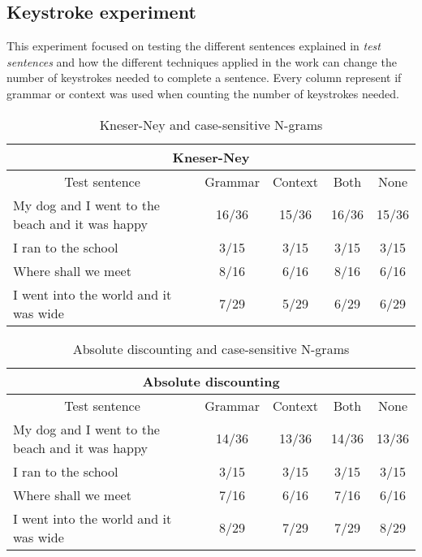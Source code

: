 \subsection{Keystroke experiment}
This experiment focused on testing the different sentences explained in \emph{test sentences} and how the different techniques applied in the work can change the number of keystrokes needed to complete a sentence. Every column represent if grammar or context was used when counting the number of keystrokes needed.

\begin{table}[H]
\centering
\caption{Kneser-Ney and case-sensitive N-grams}
{\scriptsize
\begin{tabular}{ |p{}|c|c|c|c| }

	\hline
	\multicolumn{5}{|c|}{Kneser-Ney} \\
	\hline
	\multicolumn{1}{|c|}{Test sentence} & Grammar & Context & Both & None \\
	\hline
	My dog and I went to the beach and it was happy & 16/36 & 15/36 & 16/36 & 15/36 \\
	\hline
	I ran to the school & 3/15 & 3/15 & 3/15 & 3/15 \\
	\hline
	Where shall we meet & 8/16 & 6/16 & 8/16 & 6/16 \\
	\hline
	I went into the world and it was wide & 7/29 & 5/29 & 6/29 & 6/29 \\
	\hline
\end{tabular}
}
\end{table}

\vspace{-1cm}
\begin{table}[H]
\centering
\caption{Absolute discounting and case-sensitive N-grams}
{\scriptsize
\begin{tabular}{ |p{}|c|c|c|c| }
	\hline
	\multicolumn{5}{|c|}{Absolute discounting} \\
	\hline
	\multicolumn{1}{|c|}{Test sentence} & Grammar & Context & Both & None \\
	\hline
	My dog and I went to the beach and it was happy & 14/36 & 13/36 & 14/36 & 13/36 \\
	\hline
	I ran to the school & 3/15 & 3/15 & 3/15 & 3/15 \\
	\hline
	Where shall we meet & 7/16 & 6/16 & 7/16 & 6/16 \\
	\hline
	I went into the world and it was wide & 8/29 & 7/29 & 7/29 & 8/29 \\
	\hline
\end{tabular}
}
\end{table}

